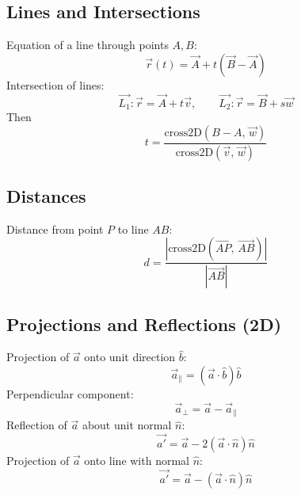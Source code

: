 \subsection*{Lines and Intersections}
Equation of a line through points $A,B$:
\[
\vec{r}(t) = \vec{A} + t(\vec{B} - \vec{A})
\]
Intersection of lines:
\[
\vec{L_1}: \vec{r} = \vec{A} + t\vec{v}, \qquad
\vec{L_2}: \vec{r} = \vec{B} + s\vec{w}
\]
Then
\[
t = \frac{\text{cross2D}(B-A,\,\vec{w})}{\text{cross2D}(\vec{v},\,\vec{w})}
\]

\subsection*{Distances}
Distance from point $P$ to line $AB$:
\[
d = \frac{|\text{cross2D}(\vec{AP},\,\vec{AB})|}{|\vec{AB}|}
\]

\subsection*{Projections and Reflections (2D)}
Projection of $\vec{a}$ onto unit direction $\hat{b}$:
\[
\vec{a}_{\parallel} = (\vec{a}\cdot\hat{b})\hat{b}
\]
Perpendicular component:
\[
\vec{a}_{\perp} = \vec{a} - \vec{a}_{\parallel}
\]
Reflection of $\vec{a}$ about unit normal $\hat{n}$:
\[
\vec{a'} = \vec{a} - 2(\vec{a}\cdot\hat{n})\hat{n}
\]
Projection of $\vec{a}$ onto line with normal $\hat{n}$:
\[
\vec{a'} = \vec{a} - (\vec{a}\cdot\hat{n})\hat{n}
\]
